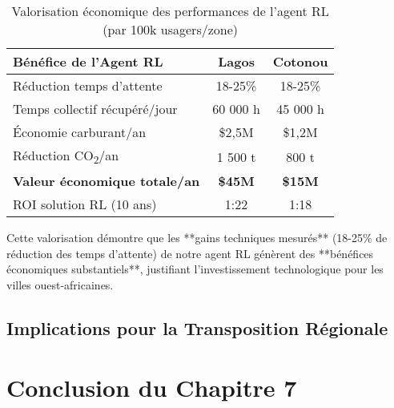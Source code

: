 \begin{table}[htbp]
    \centering
    \caption{Valorisation économique des performances de l'agent RL (par 100k usagers/zone)}
    \label{tab:valorisation_performances_rl}
    \begin{tabular}{|l|c|c|}
        \hline
        \textbf{Bénéfice de l'Agent RL}      & \textbf{Lagos} & \textbf{Cotonou} \\
        \hline
        Réduction temps d'attente            & 18-25\%        & 18-25\%          \\
        Temps collectif récupéré/jour        & 60 000 h       & 45 000 h         \\
        Économie carburant/an                & \$2,5M         & \$1,2M           \\
        Réduction CO\textsubscript{2}/an     & 1 500 t        & 800 t            \\
        \textbf{Valeur économique totale/an} & \textbf{\$45M} & \textbf{\$15M}   \\
        ROI solution RL (10 ans)             & 1:22           & 1:18             \\
        \hline
    \end{tabular}
\end{table}

Cette valorisation démontre que les **gains techniques mesurés** (18-25\% de réduction des temps d'attente) de notre agent RL génèrent des **bénéfices économiques substantiels**, justifiant l'investissement technologique pour les villes ouest-africaines.

\subsection{Implications pour la Transposition Régionale}

\section{Conclusion du Chapitre 7}
